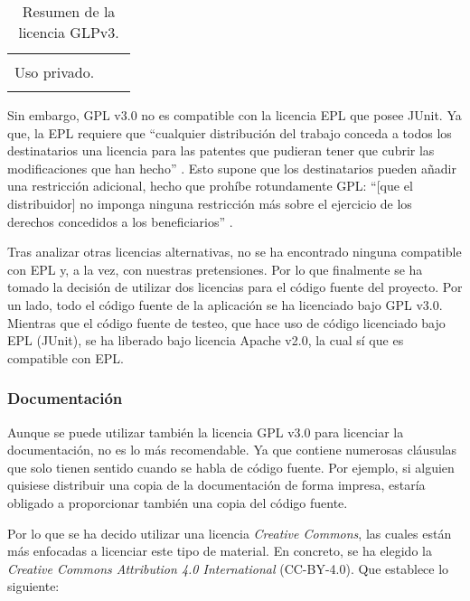 \begin{longtable}[]{@{}lll@{}}
\begin{minipage}[t]{0.32\columnwidth}
\strut
\end{minipage}\tabularnewline
\begin{minipage}[t]{0.19\columnwidth}\raggedright\strut
Uso privado.\strut
\end{minipage} & \begin{minipage}[t]{0.40\columnwidth}\raggedright\strut
\strut
\end{minipage} & \begin{minipage}[t]{0.32\columnwidth}\raggedright\strut
\strut
\end{minipage}\tabularnewline
\bottomrule
\caption{Resumen de la licencia GLPv3.}
\end{longtable}

Sin embargo, GPL v3.0 no es compatible con la licencia EPL que posee
JUnit. Ya que, la EPL requiere que ``cualquier distribución del trabajo
conceda a todos los destinatarios una licencia para las patentes que
pudieran tener que cubrir las modificaciones que han hecho''
\citep{license:epl}. Esto supone que los destinatarios pueden añadir una
restricción adicional, hecho que prohíbe rotundamente GPL: ``{[}que el
distribuidor{]} no imponga ninguna restricción más sobre el ejercicio de
los derechos concedidos a los beneficiarios'' \citep{license:gplv3}.

Tras analizar otras licencias alternativas, no se ha encontrado ninguna
compatible con EPL y, a la vez, con nuestras pretensiones. Por lo que
finalmente se ha tomado la decisión de utilizar dos licencias para el
código fuente del proyecto. Por un lado, todo el código fuente de la
aplicación se ha licenciado bajo GPL v3.0. Mientras que el código fuente
de testeo, que hace uso de código licenciado bajo EPL (JUnit), se ha
liberado bajo licencia Apache v2.0, la cual sí que es compatible con
EPL.

\subsubsection{Documentación}\label{documentaciuxf3n}

Aunque se puede utilizar también la licencia GPL v3.0 para licenciar la
documentación, no es lo más recomendable. Ya que contiene numerosas
cláusulas que solo tienen sentido cuando se habla de código fuente. Por
ejemplo, si alguien quisiese distribuir una copia de la documentación de
forma impresa, estaría obligado a proporcionar también una copia del
código fuente.

Por lo que se ha decido utilizar una licencia \emph{Creative Commons},
las cuales están más enfocadas a licenciar este tipo de material. En
concreto, se ha elegido la \emph{Creative Commons Attribution 4.0
International} (CC-BY-4.0). Que establece lo siguiente:
\citep{license:ccby4}

